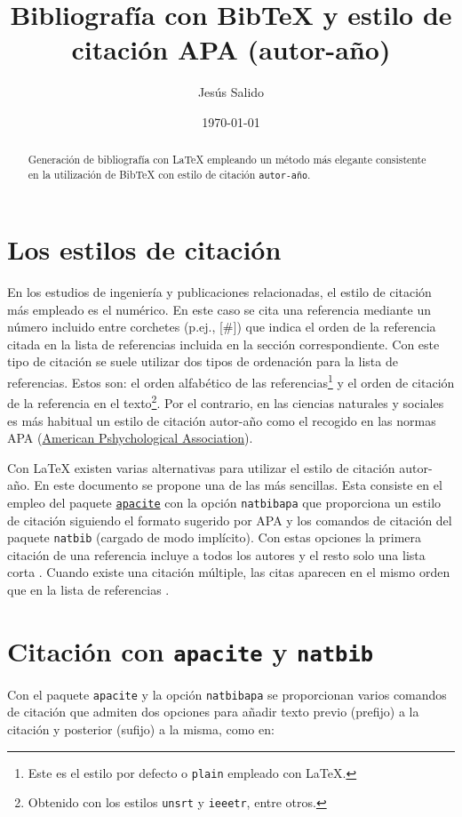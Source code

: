 \documentclass[11pt,a4paper]{article}
\author{Jesús Salido}
\title{Bibliografía con Bib\TeX{} y estilo de citación APA (autor-año)}
\date{\today}
\begin{document}
\maketitle


\begin{abstract}
Generación de bibliografía con \LaTeX{} empleando un método más elegante consistente en la utilización de Bib\TeX{} con estilo de citación \texttt{autor-año}.
\end{abstract}




\section{Los estilos de citación}
En los estudios de ingeniería y publicaciones relacionadas, el estilo de citación más empleado es el numérico. En este caso se cita una referencia mediante un número incluido entre corchetes (p.ej., [\#]) que indica el orden de la referencia citada en la lista de referencias incluida en la sección correspondiente. Con este tipo de citación se suele utilizar dos tipos de ordenación para la lista de referencias. Estos son: el orden alfabético de las referencias\footnote{Este es el estilo por defecto o \texttt{plain} empleado con \LaTeX.} y el orden de citación de la referencia en el texto\footnote{Obtenido con los estilos \texttt{unsrt} y \texttt{ieeetr}, entre otros.}. Por el contrario, en las ciencias naturales y sociales es más habitual un estilo de citación autor-año como el recogido en las normas APA (\href{https://apastyle.apa.org/learn/faqs/format-bibliography}{American Pshychological Association}).

Con \LaTeX{} existen varias alternativas para utilizar el estilo de citación autor-año. En este documento se propone una de las más sencillas. Esta consiste en el empleo del paquete \href{https://ctan.javinator9889.com/biblio/bibtex/contrib/apacite/apacite.pdf}{\texttt{apacite}} con la opción \texttt{natbibapa} que proporciona un estilo de citación siguiendo el formato sugerido por APA y los comandos de citación del paquete \texttt{natbib} (cargado de modo implícito). Con estas opciones la primera citación de una referencia incluye a todos los autores \citep[como por ejemplo en][]{oetiker06} y el resto solo una lista corta \citep{oetiker06}. Cuando existe una citación múltiple, las citas aparecen en el mismo orden que en la lista de referencias \citep[como por ejemplo en][]{lamport94, cascales00,goos04,kopka04}.

\section{Citación con \texttt{apacite} y \texttt{natbib}}
Con el paquete \texttt{apacite} y la opción \texttt{natbibapa} se proporcionan varios comandos de citación que admiten dos opciones para añadir texto previo (prefijo) a la citación y posterior (sufijo) a la misma, como en:
\end{document}
